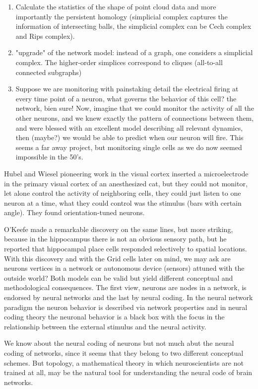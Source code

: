 \documentclass[onecollarge,runningheads]{svjour2}
\begin{document}
\begin{enumerate}
\item  Calculate the statistics of the shape of point cloud data and more importantly the persistent homology (simplicial complex captures the information of intersecting balls, the simplicial complex can be Cech complex and Rips complex).
\item  "upgrade" of the network model: instead of a graph, one considers a simplicial complex. The higher-order simplices correspond to cliques (all-to-all connected subgraphs)
\item Suppose we are monitoring with painstaking detail the electrical firing at every time point of a neuron, what governs the behavior of this cell? the network, bien sure!  Now, imagine that we could monitor the activity of all the other neurons, and we knew exactly the pattern of connections between them, and were blessed with an excellent model describing all relevant dynamics, then (maybe?) we would be able to predict when our neuron will fire. This seems a far away project, but monitoring  single cells as we do now seemed impossible in the 50's. %
\end{enumerate}


Hubel and Wiesel pioneering work in the visual cortex inserted a microelectrode in the primary visual cortex of an anesthesized cat, but they could not monitor, let alone control the activity of neighboring cells, they could just listen to one neuron at a time, what they could control was the stimulus (bars with certain angle). They found orientation-tuned neurons.

O'Keefe made a remarkable discovery on the same lines, but more striking, because in the hippocampus there is not an obvious sensory path, but he reported that hippocampal place cells responded selectively to spatial locations.
With this discovery and with the Grid cells later on mind, we may ask are neurons vertices in a network or autonomous device (sensors) attuned with the outside world? Both models can be valid but yield different conceptual and methodological consequences. The first view, neurons are nodes in a network, is endorsed by neural networks and the last by neural coding. In the neural network paradigm the neuron behavior is described via network properties and in neural coding theory the neuronal behavior is a black box with the focus in the relationship between the external stimulus and the neural activity.

We know about the neural coding of neurons but not much abut the neural coding of networks, since it seems that they belong to two different conceptual schemes. But topology, a mathematical theory in which neuroscientists are not trained at all, may be the natural tool for understanding the neural code of brain networks.
\end{document}
